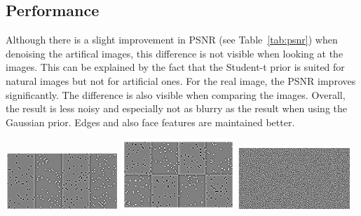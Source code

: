 \documentclass[a4paper,11pt, final]{scrartcl}
\begin{document}
\subsection*{Performance}
Although there is a slight improvement in PSNR (see Table~\ref{tab:psnr}) when denoising the artifical images, this difference is not visible when looking at the images. This can be explained by the fact that the Student-t prior is suited for natural images but not for artificial ones.
For the real image, the PSNR improves significantly. The difference is also visible when comparing the images. Overall, the result is less noisy and especially not as blurry as the result when using the Gaussian prior. Edges and also face features are maintained better.

{
\centering 
\includegraphics[width=0.32\textwidth]{ex4_stripes_grad.png}
\includegraphics[width=0.32\textwidth]{ex4_checker_grad.png}
\includegraphics[width=0.32\textwidth]{ex4_image_grad.png}
}

\vspace{1cm}
\end{document}
